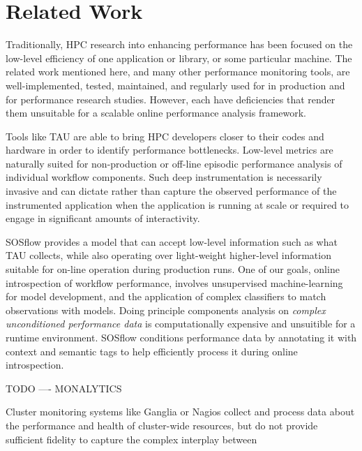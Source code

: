 
\section{Related Work}
%
Traditionally, HPC research into enhancing performance has been
focused on the low-level efficiency of one application or library, or
some particular machine.
%
The related work mentioned here, and many other performance monitoring
tools, are well-implemented, tested, maintained, and regularly used
for in production and for performance research studies.
%
However, each have deficiencies that render them unsuitable for a scalable
online performance analysis framework.
%
\par
%
Tools like TAU  are able to bring HPC developers
closer to their codes and hardware in order to identify performance
bottlenecks.
%
Low-level metrics are naturally suited for non-production or off-line
episodic performance analysis of individual workflow components.
%
Such deep instrumentation is necessarily invasive and can dictate
rather than capture the observed performance of the instrumented
application when the application is running at scale or required to
engage in significant amounts of interactivity.
%
\par
%
SOSflow provides a model that can accept low-level information such as
what TAU collects, while also operating over light-weight higher-level
information suitable for on-line operation during production runs.
%
One of our goals, online introspection of workflow performance,
involves unsupervised machine-learning for model development, and the
application of complex classifiers to match observations with models.
%
Doing principle components analysis on \textit{complex unconditioned
  performance data} is computationally expensive and unsuitible for a
runtime environment.
%
SOSflow conditions performance data by annotating it with context and
semantic tags to help efficiently process it during online
introspection.
%
\par
%
TODO ---- MONALYTICS
%
\par
%
Cluster monitoring systems like Ganglia \cite{massie2004ganglia} or
Nagios \cite{katsaros2011building} collect and process data about the
performance and health of cluster-wide resources, but do not provide
sufficient fidelity to capture the complex interplay between
